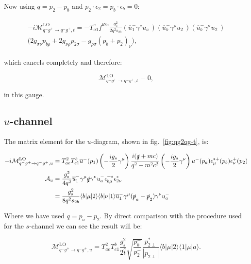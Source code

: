 		Now using $q=p_2-p_b$ and $p_2\cdot\epsilon_2 = p_b\cdot\epsilon_b = 0$:

		\begin{align}
		\begin{split}
			-i\mathcal{M}_{q^-g^+\to q^-g^+, t}^{\text{LO}} =
		        -T^e_{a1}f^{b2e}\frac{g_s^2}{2q^2s_{2b}}\left(\overline{u}^-_1\gamma^{\nu}u^-_a\right)\left(\overline{u}^-_b\gamma^{\rho}u^-_2\right)\left(\overline{u}^-_b\gamma^{\sigma}u^-_2\right)\\
			\Big(2g_{\sigma\nu}p_{b\rho} + 2g_{\nu\rho}p_{2\sigma} - g_{\rho\sigma}(p_b+p_2)_\nu\Big),
		\end{split}
		\end{align}

		which cancels completely and therefore:

		\begin{equation}
			\mathcal{M}_{q^-g^+\to q^-g^+, t}^{\text{LO}}=0,
			\label{eqn:t-channel}
		\end{equation}

		in this gauge.

	\subsection{$u$-channel}

		The matrix element for the $u$-diagram, shown in fig.~\eqref{fig:qg2qg-t}, is:

		\begin{equation}
			\begin{split}
			-i\mathcal{M}_{q^-g^+\to q^-g^+, u}^{\text{LO}} &= T^2_{ae}T^b_{e1}\overline{u}^-(p_1)\left(-\frac{ig_s}{2}\gamma^\mu\right)
			\frac{i(\slashed q+mc)}{q^2-m^2c^2}\left(-\frac{ig_s}{2}\gamma^\nu\right)u^-(p_a)\epsilon_\mu^{*+}(p_b)\epsilon^+_\nu(p_2)\\
			\mathcal{A}_u &= \frac{g_s^2}{4q^2}\overline{u}^-_1\gamma^\mu\slashed q\gamma^\nu u^-_a\epsilon^{+*}_{b\mu}\epsilon^*_{2\nu}\\
			&= \frac{g_s^2}{8q^2s_{2b}}\langle b|\mu|2\rangle\langle b|\nu|1\rangle\overline{u}^-_1\gamma^\mu(\slashed{p}_a-\slashed{p}_2)\gamma^\nu u^-_a\\
			\end{split}
		\end{equation}

		Where we have used $q=p_a-p_2$.  By direct comparison with the procedure used for the $s$-channel we can see the result will be:

		\begin{equation}
		\mathcal{M}_{q^-g^+\to q^-g^+, u}^{\text{LO}}=
		T^2_{ae}T^b_{e1}\frac{g_s^2}{2\hat{t}}\sqrt{\frac{p_b^-}{p_2^-}}\frac{p^*_{2\perp}}{|p_{2\perp}|}\langle{b}|\mu|2\rangle\langle{1}|\mu|a\rangle.
		\label{eqn:u-channel}
		\end{equation}

